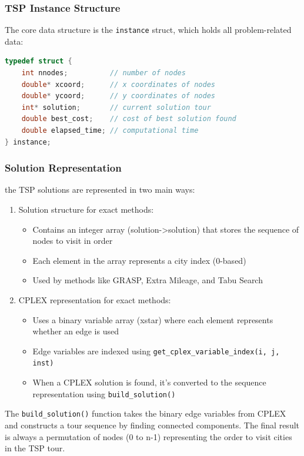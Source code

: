 \documentclass{article}
\begin{document}
\subsubsection{TSP Instance Structure}
The core data structure is the \texttt{instance} struct, which holds all problem-related data:
\begin{lstlisting}[language=C, caption={TSP Instance Structure}]
typedef struct {
	int nnodes;          // number of nodes
	double* xcoord;      // x coordinates of nodes
	double* ycoord;      // y coordinates of nodes
	int* solution;       // current solution tour
	double best_cost;    // cost of best solution found
	double elapsed_time; // computational time
} instance;
\end{lstlisting}

\subsubsection{Solution Representation}
the TSP solutions are represented in two main ways:
\begin{enumerate}
	\item Solution structure for exact methods:
	\begin{itemize}
		\item Contains an integer array (solution->solution) that stores the sequence of nodes to visit in order
		\item Each element in the array represents a city index (0-based)
		\item Used by methods like GRASP, Extra Mileage, and Tabu Search
	\end{itemize}
	\item CPLEX representation for exact methods:
	\begin{itemize}
		\item Uses a binary variable array (xstar) where each element represents whether an edge is used
		\item Edge variables are indexed using \texttt{get\_cplex\_variable\_index(i, j, inst)}
		\item When a CPLEX solution is found, it's converted to the sequence representation using \texttt{build\_solution()}
	\end{itemize}
\end{enumerate}

The \texttt{build\_solution()} function takes the binary edge variables from CPLEX and constructs a tour sequence by finding connected components. 
The final result is always a permutation of nodes (0 to n-1) representing the order to visit cities in the TSP tour.
\end{document}
